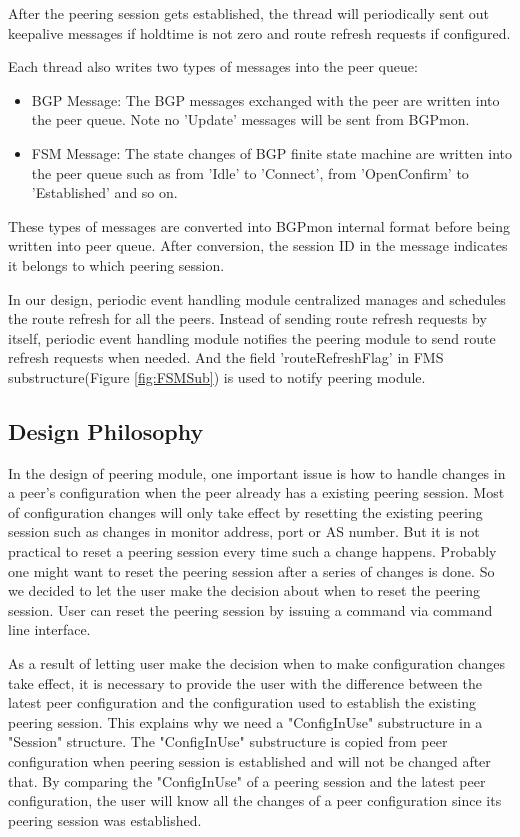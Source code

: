 After the peering session gets established, the thread will periodically sent out keepalive messages if holdtime is not zero and route refresh requests if configured.

Each thread also writes two types of messages into the peer queue:
\begin{itemize}
\item{BGP Message: The BGP messages exchanged with the peer are written into the peer queue. Note no 'Update' messages will be sent from BGPmon. }
\item{FSM Message: The state changes of BGP finite state machine are written into the peer queue such as from 'Idle' to 'Connect', from 'OpenConfirm' to 'Established' and so on.}
\end{itemize}
These types of messages are converted into BGPmon internal format before being written into peer queue. After conversion, the session ID in the message indicates it belongs to which peering session.

In our design, periodic event handling module centralized manages and schedules the route refresh for all the peers. Instead of sending route refresh requests by itself, periodic event handling module notifies the peering module to send route refresh requests when needed. And the field 'routeRefreshFlag' in FMS substructure(Figure \ref{fig:FSMSub}) is used to notify peering module. 

\subsection{Design Philosophy}
In the design of peering module, one important issue is how to handle changes in a peer's configuration when the peer already has a existing peering session. Most of configuration changes will only take effect by resetting the existing peering session such as changes in monitor address, port or AS number. But it is not practical to reset a peering session every time such a change happens. Probably one might want to reset the peering session after a series of changes is done. So we decided to let the user make the decision about when to reset the peering session. User can reset the peering session by issuing a command via command line interface. 

As a result of letting user make the decision when to make configuration changes take effect, it is necessary to provide the user with the difference between the latest peer configuration and the configuration used to establish the existing peering session.
This explains why we need a "ConfigInUse" substructure in a "Session" structure. The "ConfigInUse" substructure is copied from peer configuration when peering session is established and will not be changed after that.
By comparing the "ConfigInUse" of a peering session and the latest peer configuration, the user will know all the changes of a peer configuration since its peering session was established. 


